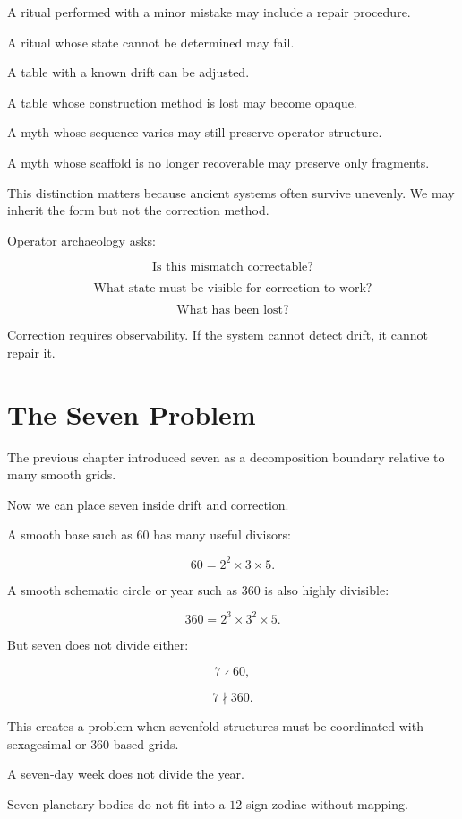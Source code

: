 \documentclass[11pt]{book}
\begin{document}
A ritual performed with a minor mistake may include a repair procedure.

A ritual whose state cannot be determined may fail.

A table with a known drift can be adjusted.

A table whose construction method is lost may become opaque.

A myth whose sequence varies may still preserve operator structure.

A myth whose scaffold is no longer recoverable may preserve only fragments.

This distinction matters because ancient systems often survive unevenly. We may inherit the form but not the correction method.

Operator archaeology asks:

\[
\text{Is this mismatch correctable?}
\]

\[
\text{What state must be visible for correction to work?}
\]

\[
\text{What has been lost?}
\]

Correction requires observability. If the system cannot detect drift, it cannot repair it.

\section{The Seven Problem}

The previous chapter introduced seven as a decomposition boundary relative to many smooth grids.

Now we can place seven inside drift and correction.

A smooth base such as \(60\) has many useful divisors:

\[
60 = 2^2 \times 3 \times 5.
\]

A smooth schematic circle or year such as \(360\) is also highly divisible:

\[
360 = 2^3 \times 3^2 \times 5.
\]

But seven does not divide either:

\[
7 \nmid 60,
\]

\[
7 \nmid 360.
\]

This creates a problem when sevenfold structures must be coordinated with sexagesimal or \(360\)-based grids.

A seven-day week does not divide the year.

Seven planetary bodies do not fit into a \(12\)-sign zodiac without mapping.
\end{document}
